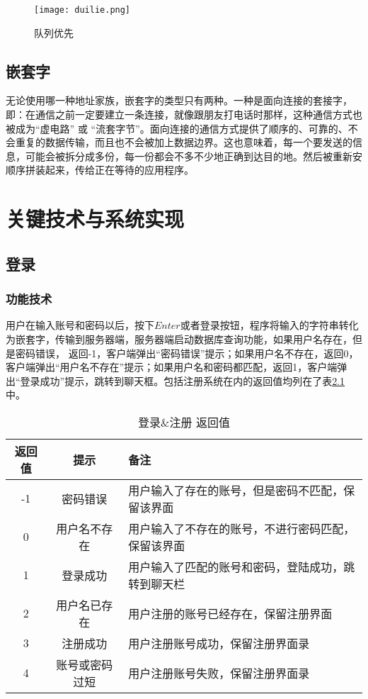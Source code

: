 \documentclass[forprint]{OSPaper}
\begin{document}
\begin{figure}[ht]
	\centering
	\texttt{[image: duilie.png]}
	\caption{队列优先}
	\label{fig:12}
\end{figure}

\section{嵌套字}

无论使用哪一种地址家族，嵌套字的类型只有两种。一种是面向连接的套接字，即：在通信之前一定要建立一条连接，就像跟朋友打电话时那样，这种通信方式也被成为“虚电路” 或 “流套字节”。面向连接的通信方式提供了顺序的、可靠的、不会重复的数据传输，而且也不会被加上数据边界。这也意味着，每一个要发送的信息，可能会被拆分成多份，每一份都会不多不少地正确到达目的地。然后被重新安顺序拼装起来，传给正在等待的应用程序。
\clearpage
\chapter{关键技术与系统实现}

\section{登录}

\subsection{功能技术}

用户在输入账号和密码以后，按下$Enter$或者登录按钮，程序将输入的字符串转化为嵌套字，传输到服务器端，服务器端启动数据库查询功能，如果用户名存在，但是密码错误，
返回-1，客户端弹出“密码错误”提示；如果用户名不存在，返回0，客户端弹出“用户名不存在”提示；如果用户名和密码都匹配，返回1，客户端弹出“登录成功”提示，跳转到聊天框。包括注册系统在内的返回值均列在了表\ref{table:3}中。

\begin{table}[ht]
	\caption{登录\&注册 返回值}
	\label{table:3}
	\begin{tabular}{ccl}
		\hline
		返回值 & 提示     & 备注                         \\ \hline
		-1  & 密码错误   & 用户输入了存在的账号，但是密码不匹配，保留该界面   \\
		0   & 用户名不存在 & 用户输入了不存在的账号，不进行密码匹配，保留该界面  \\
		1   & 登录成功   & 用户输入了匹配的账号和密码，登陆成功，跳转到聊天栏  \\
		2   & 用户名已存在 & 用户注册的账号已经存在，保留注册界面         \\
		3   & 注册成功   & 用户注册账号成功，保留注册界面录 \\
		4   & 账号或密码过短   & 用户注册账号失败，保留注册界面录 \\ \hline
	\end{tabular}
\end{table}
\end{document}

